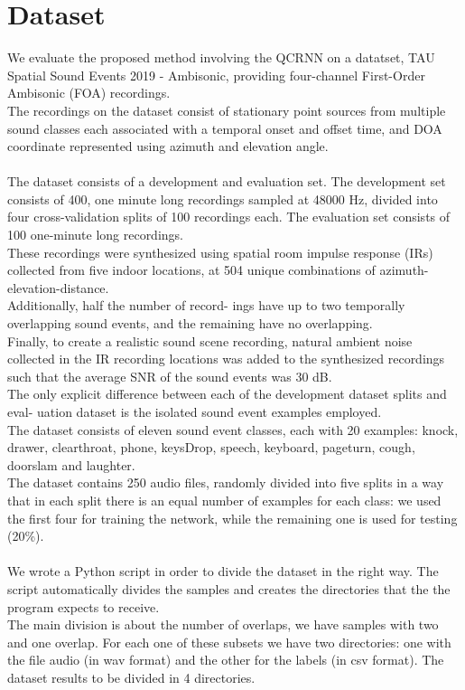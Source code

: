 \documentclass{article}
\begin{document}
    \section{Dataset}
    We evaluate the proposed method involving the QCRNN on a datatset, TAU Spatial Sound Events 2019 - Ambisonic, providing four-channel First-Order Ambisonic (FOA) recordings.\\
    The recordings on the dataset consist of stationary point sources from multiple sound classes each associated with a temporal onset and offset time, and DOA coordinate represented using azimuth and elevation angle.\\
    \\ The dataset consists of a development and evaluation set.  The development set consists of 400, one minute long recordings sampled at 48000 Hz, divided into four cross-validation splits of 100 recordings each. The evaluation set consists of 100 one-minute long recordings.\\
    These recordings were synthesized using spatial room impulse response (IRs) collected from five indoor locations, at 504 unique combinations of azimuth-elevation-distance. \\
    Additionally, half the number of record- ings have up to two temporally overlapping sound events, and the remaining have no overlapping.\\
    Finally, to create a realistic sound scene recording, natural ambient noise collected in the IR recording locations was added to the synthesized recordings such that the average SNR of the sound events was 30 dB.\\
    The only explicit difference between each of the development dataset splits and eval- uation dataset is the isolated sound event examples employed.\\
    The dataset consists of eleven sound event classes, each with 20 examples: knock, drawer, clearthroat, phone, keysDrop,  speech, keyboard, pageturn, cough, doorslam and laughter.\\
    The dataset contains 250 audio files, randomly divided into five splits in a way that in each split there is an equal number of examples for each class: we used the first four for training the network, while the remaining one is used for testing (20\%).
    \\ \\ We wrote a Python script in order to divide the dataset in the right way. The script automatically divides the samples and creates the directories that the the program expects to receive.
    \\ The main division is about the number of overlaps, we have samples with two and one overlap. For each one of these subsets we have two directories: one with the file audio (in wav format) and the other for the labels (in csv format). The dataset results to be divided in 4 directories. 
\end{document}
